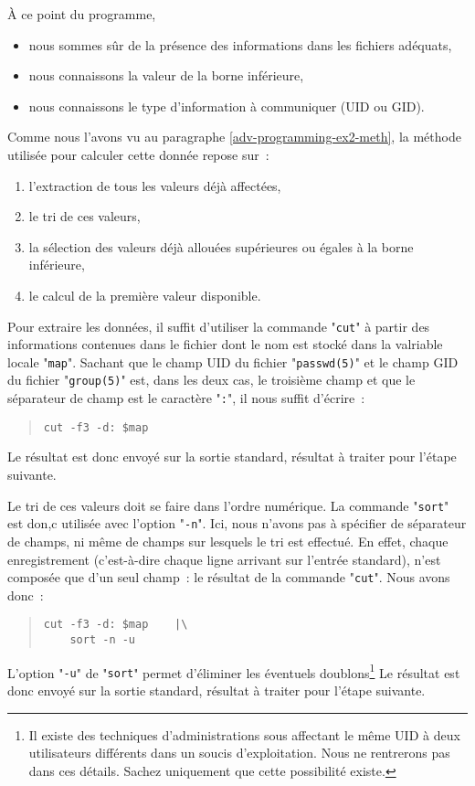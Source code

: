 {\`A} ce point du programme,
\begin{itemize}
	\item	nous sommes s{\^u}r de la pr{\'e}sence des informations dans les fichiers
			ad{\'e}quats,
	\item	nous connaissons la valeur de la borne inf{\'e}rieure,
	\item	nous connaissons le type d'information {\`a} communiquer (UID ou GID).
\end{itemize}

Comme nous l'avons vu au paragraphe \ref{adv-programming-ex2-meth}, la m{\'e}thode
utilis{\'e}e pour calculer cette donn{\'e}e repose sur~:
\begin{enumerate}
	\item	l'extraction de tous les valeurs d{\'e}j{\`a} affect{\'e}es,
	\item	le tri de ces valeurs,
	\item	la s{\'e}lection des valeurs d{\'e}j{\`a} allou{\'e}es sup{\'e}rieures ou {\'e}gales {\`a} la
			borne inf{\'e}rieure,
	\item	le calcul de la premi{\`e}re valeur disponible.
\end{enumerate}

Pour extraire les donn{\'e}es, il suffit d'utiliser la commande "{\tt cut}"
{\`a} partir des informations contenues dans le fichier dont le nom est
stock{\'e} dans la valriable locale "{\tt map}". Sachant que le champ UID
du fichier "{\tt passwd(5)}" et le champ GID du fichier "{\tt group(5)}"
est, dans les deux cas, le troisi{\`e}me champ et que le s{\'e}parateur de champ
est le caract{\`e}re "{\tt :}", il nous suffit d'{\'e}crire~:
\begin{quote}
\begin{verbatim}
cut -f3 -d: $map
\end{verbatim}
\end{quote}
Le r{\'e}sultat est donc envoy{\'e} sur la sortie standard, r{\'e}sultat {\`a} traiter pour
l'{\'e}tape suivante.

Le tri de ces valeurs doit se faire dans l'ordre num{\'e}rique. La commande
"{\tt sort}" est don,c utilis{\'e}e avec l'option "{\tt -n}". Ici, nous n'avons
pas {\`a} sp{\'e}cifier de s{\'e}parateur de champs, ni m{\^e}me de champs sur lesquels le tri est
effectu{\'e}. En effet, chaque enregistrement (c'est-{\`a}-dire chaque ligne arrivant
sur l'entr{\'e}e standard), n'est compos{\'e}e que d'un seul champ~: le r{\'e}sultat de
la commande "{\tt cut}". Nous avons donc~:
\begin{quote}
\begin{verbatim}
cut -f3 -d: $map	|\
    sort -n -u
\end{verbatim}
\end{quote}
L'option "{\tt -u}" de "{\tt sort}" permet d'{\'e}liminer les {\'e}ventuels
doublons\footnote{Il existe des techniques d'administrations sous {\Unix}
affectant le m{\^e}me UID {\`a} deux utilisateurs diff{\'e}rents dans un soucis d'exploitation.
Nous ne rentrerons pas dans ces d{\'e}tails. Sachez uniquement que cette
possibilit{\'e} existe.}
Le r{\'e}sultat est donc envoy{\'e} sur la sortie standard, r{\'e}sultat {\`a} traiter pour
l'{\'e}tape suivante.

